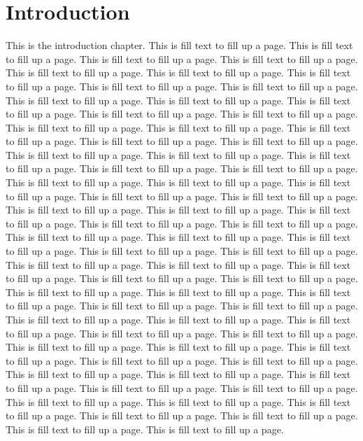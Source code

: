 \chapter{Introduction}
\label{ch:intro:introduction}

This is the introduction chapter.
This is fill text to fill up a page.
This is fill text to fill up a page.
This is fill text to fill up a page.
This is fill text to fill up a page.
This is fill text to fill up a page.
This is fill text to fill up a page.
This is fill text to fill up a page.
This is fill text to fill up a page.
This is fill text to fill up a page.
This is fill text to fill up a page.
This is fill text to fill up a page.
This is fill text to fill up a page.
This is fill text to fill up a page.
This is fill text to fill up a page.
This is fill text to fill up a page.
This is fill text to fill up a page.
This is fill text to fill up a page.
This is fill text to fill up a page.
This is fill text to fill up a page.
This is fill text to fill up a page.
This is fill text to fill up a page.
This is fill text to fill up a page.
This is fill text to fill up a page.
This is fill text to fill up a page.
This is fill text to fill up a page.
This is fill text to fill up a page.
This is fill text to fill up a page.
This is fill text to fill up a page.
This is fill text to fill up a page.
This is fill text to fill up a page.
This is fill text to fill up a page.
This is fill text to fill up a page.
This is fill text to fill up a page.
This is fill text to fill up a page.
This is fill text to fill up a page.
This is fill text to fill up a page.
This is fill text to fill up a page.
This is fill text to fill up a page.
This is fill text to fill up a page.
This is fill text to fill up a page.
This is fill text to fill up a page.
This is fill text to fill up a page.
This is fill text to fill up a page.
This is fill text to fill up a page.
This is fill text to fill up a page.
This is fill text to fill up a page.
This is fill text to fill up a page.
This is fill text to fill up a page.
This is fill text to fill up a page.
This is fill text to fill up a page.
This is fill text to fill up a page.
This is fill text to fill up a page.
This is fill text to fill up a page.
This is fill text to fill up a page.
This is fill text to fill up a page.
This is fill text to fill up a page.
This is fill text to fill up a page.
This is fill text to fill up a page.
This is fill text to fill up a page.
This is fill text to fill up a page.
This is fill text to fill up a page.
This is fill text to fill up a page.
This is fill text to fill up a page.
This is fill text to fill up a page.
This is fill text to fill up a page.
This is fill text to fill up a page.
This is fill text to fill up a page.
This is fill text to fill up a page.
This is fill text to fill up a page.
This is fill text to fill up a page.
This is fill text to fill up a page.

